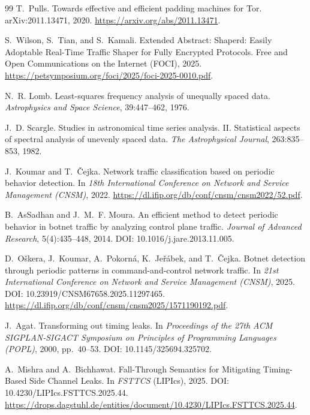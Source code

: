 \documentclass[11pt]{article}
\theoremstyle{definition}
\theoremstyle{remark}
\begin{document}
\begin{thebibliography}{99}
T.~Pulls.
\newblock Towards effective and efficient padding machines for Tor.
\newblock arXiv:2011.13471, 2020.
\newblock \url{https://arxiv.org/abs/2011.13471}.

S.~Wilson, S.~Tian, and S.~Kamali.
\newblock Extended Abstract: Shaperd: Easily Adoptable Real-Time Traffic Shaper for Fully Encrypted Protocols.
\newblock Free and Open Communications on the Internet (FOCI), 2025.
\newblock \url{https://petsymposium.org/foci/2025/foci-2025-0010.pdf}.

N.~R. Lomb.
\newblock Least-squares frequency analysis of unequally spaced data.
\newblock \emph{Astrophysics and Space Science}, 39:447--462, 1976.

J.~D. Scargle.
\newblock Studies in astronomical time series analysis. II. Statistical aspects of spectral analysis of unevenly spaced data.
\newblock \emph{The Astrophysical Journal}, 263:835--853, 1982.

J.~Koumar and T.~\v{C}ejka.
\newblock Network traffic classification based on periodic behavior detection.
\newblock In \emph{18th International Conference on Network and Service Management (CNSM)}, 2022.
\newblock \url{https://dl.ifip.org/db/conf/cnsm/cnsm2022/52.pdf}.

B.~AsSadhan and J.~M.~F. Moura.
\newblock An efficient method to detect periodic behavior in botnet traffic by analyzing control plane traffic.
\newblock \emph{Journal of Advanced Research}, 5(4):435--448, 2014.
\newblock DOI: 10.1016/j.jare.2013.11.005.

D.~O\v{s}kera, J.~Koumar, A.~Pokorn\'a, K.~Je\v{r}\'abek, and T.~\v{C}ejka.
\newblock Botnet detection through periodic patterns in command-and-control network traffic.
\newblock In \emph{21st International Conference on Network and Service Management (CNSM)}, 2025.
\newblock DOI: 10.23919/CNSM67658.2025.11297465.
\newblock \url{https://dl.ifip.org/db/conf/cnsm/cnsm2025/1571190192.pdf}.


J.~Agat.
\newblock Transforming out timing leaks.
\newblock In \emph{Proceedings of the 27th ACM SIGPLAN-SIGACT Symposium on Principles of Programming Languages (POPL)}, 2000, pp.~40--53.
\newblock DOI: 10.1145/325694.325702.

A.~Mishra and A.~Bichhawat.
\newblock Fall-Through Semantics for Mitigating Timing-Based Side Channel Leaks.
\newblock In \emph{FSTTCS} (LIPIcs), 2025.
\newblock DOI: 10.4230/LIPIcs.FSTTCS.2025.44.
\newblock \url{https://drops.dagstuhl.de/entities/document/10.4230/LIPIcs.FSTTCS.2025.44}.



\end{thebibliography}
\end{document}
